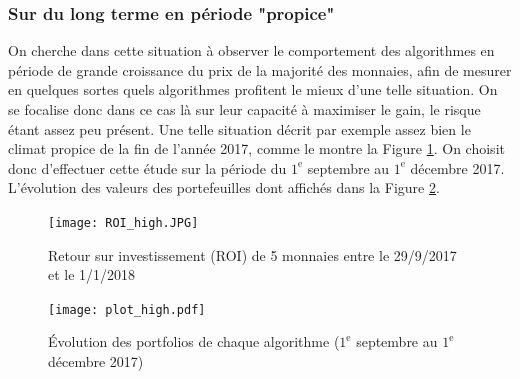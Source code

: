 \documentclass[a4paper, 10pt]{article}
\begin{document}
\subsubsection{Sur du long terme en période "propice"}

On cherche dans cette situation à observer le comportement des algorithmes en période de grande croissance du prix de la majorité des monnaies, afin de mesurer en quelques sortes quels algorithmes profitent le mieux d'une telle situation. On se focalise donc dans ce cas là sur leur capacité à maximiser le gain, le risque étant assez peu présent. Une telle situation décrit par exemple assez bien le climat propice de la fin de l'année 2017, comme le montre la Figure \ref{fig:roi_high}. On choisit donc d'effectuer cette étude sur la période du $1^{\text{e}}$ septembre au $1^{\text{e}}$ décembre 2017. L'évolution des valeurs des portefeuilles dont affichés dans la Figure \ref{fig:plot_high}.

\begin{figure}[ht!]
\begin{center}
\texttt{[image: ROI\_high.JPG]}
\caption{Retour sur investissement (ROI) de 5 monnaies entre le 29/9/2017 et le 1/1/2018}
\label{fig:roi_high}
\end{center}
\end{figure}

\begin{figure}[ht!]
\begin{center}
\texttt{[image: plot\_high.pdf]}
\caption{Évolution des portfolios de chaque algorithme ($1^{\text{e}}$ septembre au $1^{\text{e}}$ décembre 2017)}
\label{fig:plot_high}
\end{center}
\end{figure}
\end{document}
